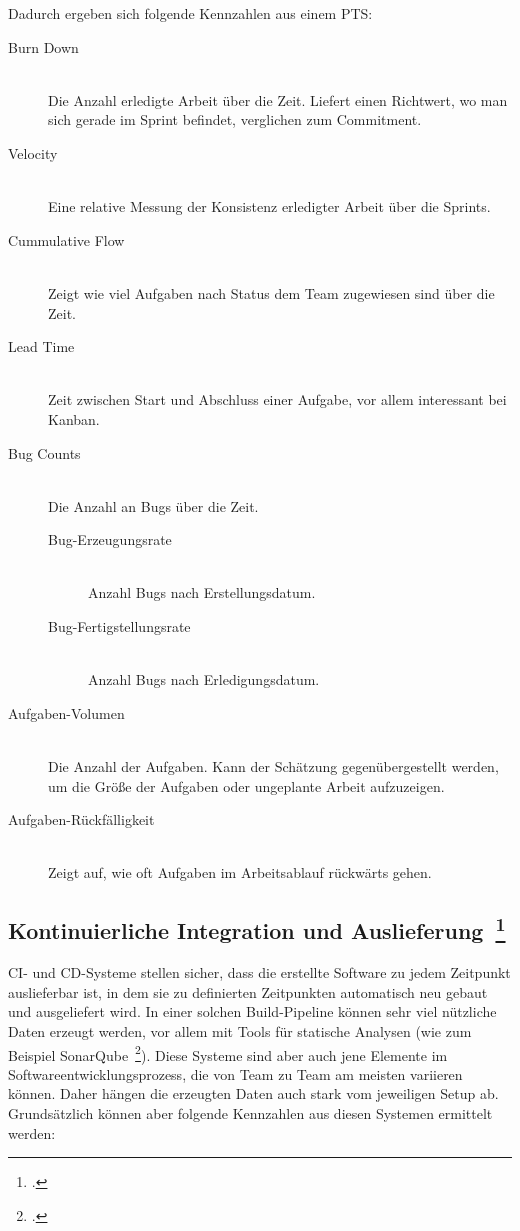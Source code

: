 Dadurch ergeben sich folgende Kennzahlen aus einem \ac{PTS}:
\begin{description}
  \item[Burn Down] \hfill \\ Die Anzahl erledigte Arbeit über die Zeit. Liefert einen Richtwert, wo man sich gerade im Sprint befindet, verglichen zum Commitment.
  \item[Velocity] \hfill \\ Eine relative Messung der Konsistenz erledigter Arbeit über die Sprints.
  \item[Cummulative Flow] \hfill \\ Zeigt wie viel Aufgaben nach Status dem Team zugewiesen sind über die Zeit.
  \item[Lead Time] \hfill \\ Zeit zwischen Start und Abschluss einer Aufgabe, vor allem interessant bei Kanban.
  \item[Bug Counts] \hfill \\ Die Anzahl an Bugs über die Zeit.
  \begin{description}
    \item[Bug-Erzeugungsrate] \hfill \\ Anzahl Bugs nach Erstellungsdatum.
    \item[Bug-Fertigstellungsrate] \hfill \\ Anzahl Bugs nach Erledigungsdatum.
  \end{description}
  \item[Aufgaben-Volumen] \hfill \\ Die Anzahl der Aufgaben. Kann der Schätzung gegenübergestellt werden, um die Größe der Aufgaben oder ungeplante Arbeit aufzuzeigen.
  \item[Aufgaben-Rückfälligkeit] \hfill \\ Zeigt auf, wie oft Aufgaben im Arbeitsablauf rückwärts gehen.
\end{description}

\subsection[Kontinuierliche Integration und Auslieferung]{Kontinuierliche Integration und Auslieferung~\footcite[vgl.][S.84ff]{davis_agile_2015}}

\ac{CI}- und \ac{CD}-Systeme stellen sicher, dass die erstellte Software zu jedem Zeitpunkt auslieferbar ist, in dem sie zu definierten Zeitpunkten automatisch neu gebaut und ausgeliefert wird.
In einer solchen Build-Pipeline können sehr viel nützliche Daten erzeugt werden, vor allem mit Tools für statische Analysen (wie zum Beispiel SonarQube~\footcite[][]{sonarqube}).
Diese Systeme sind aber auch jene Elemente im Softwareentwicklungsprozess, die von Team zu Team am meisten variieren können.
Daher hängen die erzeugten Daten auch stark vom jeweiligen Setup ab.
Grundsätzlich können aber folgende Kennzahlen aus diesen Systemen ermittelt werden:

